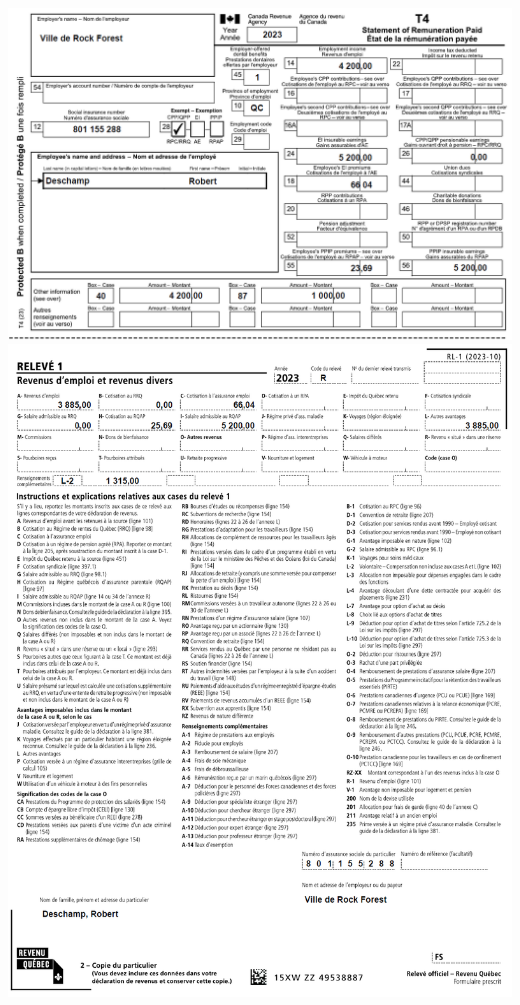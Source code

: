 \begin{question}
	
	
	\noindent
	\includegraphics[width=\textwidth]{exercice/3-4/Q8/T4.png}
	\includegraphics[width=\textwidth]{exercice/3-4/Q8/RL1.png}
\end{question}




